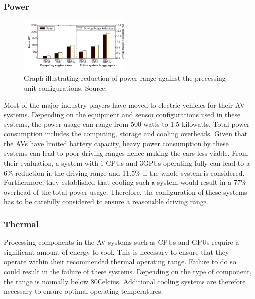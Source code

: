 \subsubsection{Power} 
\begin{figure}
	\centering
	\includegraphics[width=0.48\textwidth]{images/power_reduction}
	\caption{Graph illustrating reduction of power range against the processing unit configurations. Source:\cite{lin2018architectural}}
	\label{fig:powerred}
\end{figure}
Most of the major industry players have moved to electric-vehicles for their AV systems. Depending on the equipment and sensor configurations used in these systems, the power usage can range from 500 watts to 1.5 kilowatts. Total power consumption includes the computing, storage and cooling overheads. Given that the AVs have limited battery capacity, heavy power consumption by these systems can lead to poor driving ranges hence making the cars less viable.
From their evaluation, a system with 1 CPUs and 3GPUs operating fully can lead to a 6\% reduction in the driving range and 11.5\% if the whole system is considered. Furthermore, they established that cooling such a system would result in a 77\% overhead of the total power usage.
Therefore,  the configuration of these systems has to be carefully considered to ensure a reasonable driving range. 

\subsubsection*{Thermal} 
Processing components in the AV systems such as CPUs and GPUs require a significant amount of energy to cool. This is necessary to ensure that they operate within their recommended thermal operating range. Failure to do so could result in the failure of these systems.  Depending on the type of component, the range is normally below 80\degree Celcius. Additional cooling systems are therefore necessary to ensure optimal operating temperatures. 

